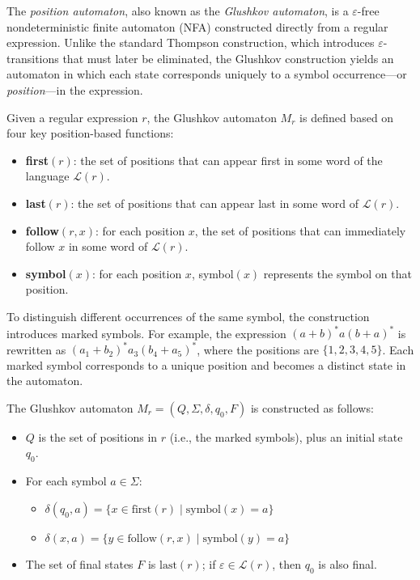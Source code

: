The \emph{position automaton}, also known as the \emph{Glushkov automaton}, is a $\varepsilon$-free nondeterministic finite automaton (NFA) constructed directly from a regular expression. Unlike the standard Thompson construction, which introduces $\varepsilon$-transitions that must later be eliminated, the Glushkov construction yields an automaton in which each state corresponds uniquely to a symbol occurrence---or \emph{position}---in the expression. \cite{mesh-of-automata}

Given a regular expression $r$, the Glushkov automaton $M_r$ is defined based on four key position-based functions:

\begin{itemize}
    \item \textbf{first$(r)$}: the set of positions that can appear first in some word of the language $\mathcal{L}(r)$.
    \item \textbf{last$(r)$}: the set of positions that can appear last in some word of $\mathcal{L}(r)$.
    \item \textbf{follow$(r, x)$}: for each position $x$, the set of positions that can immediately follow $x$ in some word of $\mathcal{L}(r)$.
    \item \textbf{symbol$(x)$}: for each position $x$, symbol$(x)$ represents the symbol on that position.
\end{itemize}

To distinguish different occurrences of the same symbol, the construction introduces marked symbols. For example, the expression $(a + b)^*a(b + a)^*$ is rewritten as $(a_1 + b_2)^*a_3(b_4 + a_5)^*$, where the positions are $\{1,2,3,4,5\}$. Each marked symbol corresponds to a unique position and becomes a distinct state in the automaton.

The Glushkov automaton $M_r = (Q, \Sigma, \delta, q_0, F)$ is constructed as follows:
\begin{itemize}
    \item $Q$ is the set of positions in $r$ (i.e., the marked symbols), plus an initial state $q_0$.
    \item For each symbol $a \in \Sigma$:
    \begin{itemize}
        \item $\delta(q_0, a) = \{ x \in \text{first}(r) \mid \text{symbol}(x) = a \}$
        \item $\delta(x, a) = \{ y \in \text{follow}(r, x) \mid \text{symbol}(y) = a \}$
    \end{itemize}
    \item The set of final states $F$ is $\text{last}(r)$; if $\varepsilon \in \mathcal{L}(r)$, then $q_0$ is also final.
\end{itemize}

